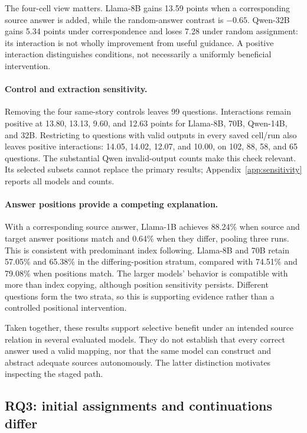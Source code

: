 The four-cell view matters. Llama-8B gains 13.59 points when a corresponding source answer is added, while the random-answer contrast is $-0.65$. Qwen-32B gains 5.34 points under correspondence and loses 7.28 under random assignment: its interaction is not wholly improvement from useful guidance. A positive interaction distinguishes conditions, not necessarily a uniformly beneficial intervention.

\paragraph{Control and extraction sensitivity.}
Removing the four same-story controls leaves 99 questions. Interactions remain positive at 13.80, 13.13, 9.60, and 12.63 points for Llama-8B, 70B, Qwen-14B, and 32B. Restricting to questions with valid outputs in every saved cell/run also leaves positive interactions: 14.05, 14.02, 12.07, and 10.00, on 102, 88, 58, and 65 questions. The substantial Qwen invalid-output counts make this check relevant. Its selected subsets cannot replace the primary results; Appendix~\ref{app:sensitivity} reports all models and counts.

\paragraph{Answer positions provide a competing explanation.}
With a corresponding source answer, Llama-1B achieves 88.24\% when source and target answer positions match and 0.64\% when they differ, pooling three runs. This is consistent with predominant index following. Llama-8B and 70B retain 57.05\% and 65.38\% in the differing-position stratum, compared with 74.51\% and 79.08\% when positions match. The larger models' behavior is compatible with more than index copying, although position sensitivity persists. Different questions form the two strata, so this is supporting evidence rather than a controlled positional intervention.

Taken together, these results support selective benefit under an intended source relation in several evaluated models. They do not establish that every correct answer used a valid mapping, nor that the same model can construct and abstract adequate sources autonomously. The latter distinction motivates inspecting the staged path.

\subsection{RQ3: initial assignments and continuations differ}
\label{sec:phase3results}
